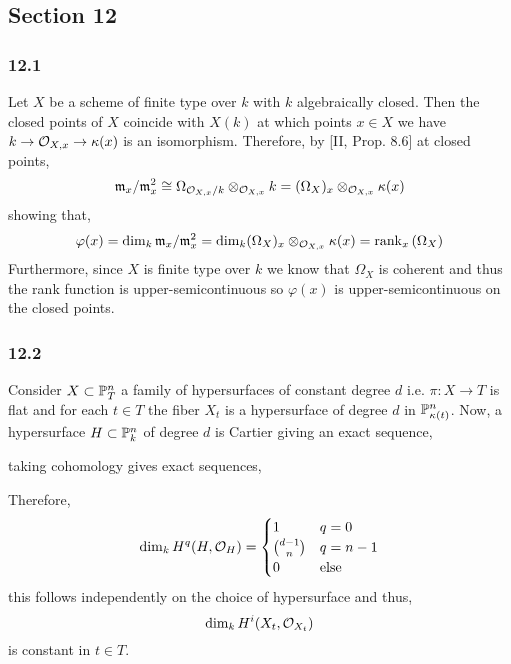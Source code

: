 \documentclass[12pt]{article}
\begin{document}
\subsection{Section 12}

\subsubsection{12.1}

Let $X$ be a scheme of finite type over $k$ with $k$ algebraically closed. Then the closed points of $X$ coincide with $X(k)$ at which points $x \in X$ we have $k \to \stalk{X}{x} \to \kappa(x)$ is an isomorphism. Therefore, by [II, Prop. 8.6] at closed points,
\[ \m_x / \m_x^2 \cong \Omega_{\stalk{X}{x}/k} \otimes_{\stalk{X}{x}} k = (\Omega_X)_x \otimes_{\stalk{X}{x}} \kappa(x) \]
showing that,
\[ \varphi(x) = \dim_k \m_x / \m_x^2 = \dim_k(\Omega_X)_x \otimes_{\stalk{X}{x}} \kappa(x) = \rank_x{(\Omega_X)} \]
Furthermore, since $X$ is finite type over $k$ we know that $\Omega_X$ is coherent and thus the rank function is upper-semicontinuous so $\varphi(x)$ is upper-semicontinuous on the closed points.

\subsubsection{12.2}

Consider $X \subset \P^n_T$ a family of hypersurfaces of constant degree $d$ i.e. $\pi : X \to T$ is flat and for each $t \in T$ the fiber $X_t$ is a hypersurface of degree $d$ in $\P^n_{\kappa(t)}$. Now, a hypersurface $H \subset \P^n_k$ of degree $d$ is Cartier giving an exact sequence,
\begin{center}
\end{center}
taking cohomology gives exact sequences,
\begin{center}
\end{center}
Therefore,
\[ \dim_k H^{q}(H, \struct{H}) = \begin{cases}
1 & q = 0
\\
{d - 1 \choose n } & q = n-1
\\
0 & \text{else}
\end{cases} \] 
this follows independently on the choice of hypersurface and thus,
\[ \dim_k H^i(X_t, \struct{X_t}) \]
is constant in $t \in T$.
\end{document}

